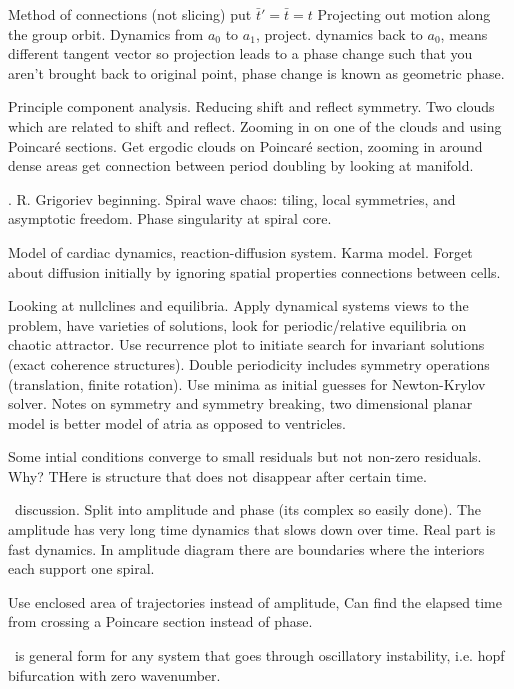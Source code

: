 \begin{description}
{\begin{description}
Method of connections (not slicing)
put $\bar{t}' = \bar{t} = t$
Projecting out motion along the group orbit. Dynamics from $a_0$ to $a_1$, project.
dynamics back to $a_0$, means different tangent vector so projection leads to a phase
change such that you aren't brought back to original point, phase change is
known as geometric phase.

Principle component analysis. Reducing shift and reflect symmetry. Two clouds
which are related to shift and reflect. Zooming in on one of the clouds and
using Poincar\'e sections. Get ergodic clouds on Poincar\'e section, zooming
in around dense areas get connection between period doubling by looking at manifold.

\item[Excitable Media Discussion]
.
R. Grigoriev beginning. Spiral wave chaos: tiling, local symmetries, and
asymptotic freedom. Phase singularity at spiral core.

Model of cardiac dynamics, reaction-diffusion system. Karma model.
Forget about diffusion initially by ignoring spatial properties connections between
cells.

Looking at nullclines and equilibria. Apply dynamical systems views to the problem,
have varieties of solutions, look for periodic/relative equilibria on chaotic attractor.
Use recurrence plot to initiate search for invariant solutions (exact coherence structures).
Double periodicity includes symmetry operations (translation, finite rotation). Use
minima as initial guesses for Newton-Krylov solver. Notes on symmetry and symmetry breaking,
two dimensional planar model is better model of atria as opposed to ventricles.

Some intial conditions converge to small residuals but not non-zero residuals. Why? THere
is structure that does not disappear after certain time.

\CGLe\ discussion. Split into amplitude and phase (its complex so easily done). The amplitude
has very long time dynamics that slows down over time. Real part is fast dynamics. In amplitude
diagram there are boundaries where the interiors each support one spiral.

Use enclosed area of trajectories instead of amplitude, Can find the elapsed time from crossing a
Poincare section instead of phase.

\CGLe\ is general form for any system that goes through oscillatory instability, i.e. hopf bifurcation
with zero wavenumber.


\end{description}}
\end{description}
